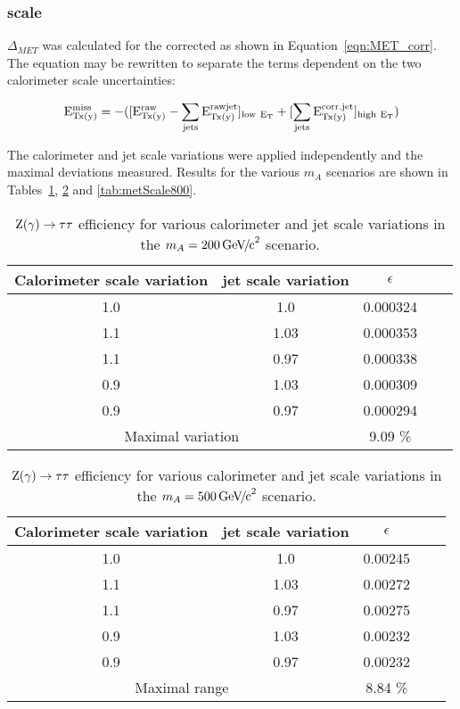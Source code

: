 \subsubsection{\MET scale}
$\Delta_{MET}$ was calculated for the corrected \MET as shown in Equation~\ref{eqn:MET_corr}. The equation may be rewritten to separate the terms dependent on the two calorimeter scale uncertainties: 

\begin{equation}
\rm E _{\rm Tx(y)}^{miss}= -([\rm E _{Tx(y)}^{\rm raw}-
                           \sum  _{jets}\rm E _{\rm Tx(y)}^{\rm raw jet}] _{\rm low~\rm E _{\rm T}} +
                           [\sum _{jets}\rm E _{\rm Tx(y)}^{\rm corr.jet}] _{\rm high~E _{\rm T}})
\end{equation}

The calorimeter and jet scale variations were applied independently and the maximal deviations measured. Results for the various $m_{A}$ scenarios are shown in Tables~\ref{tab:metScale200}, \ref{tab:metScale500} and \ref{tab:metScale800}.

\begin{table}[!Hh]
	\centering
	\begin{tabular}{|c|c|c|c|c|}
	\hline
	Calorimeter scale variation & jet scale variation & $\epsilon$ \\ \hline
	1.0   &  1.0  &   0.000324 \\ \hline
	1.1   &  1.03 &   0.000353 \\ \hline
	1.1   &  0.97 &   0.000338 \\ \hline
	0.9   &  1.03 &   0.000309 \\ \hline
	0.9   &  0.97 &   0.000294 \\ \hline
	\multicolumn{2}{|c|}{Maximal variation} & 9.09 \% \\ \hline          
    \end{tabular}
\caption{$\mathrm{Z(\gamma) \rightarrow \tau\tau}$ \MET efficiency for various calorimeter and jet scale variations in the $m_{A} = 200 {\,\mathrm{Ge\hspace{-.08em}V\hspace{-0.16em}/\hspace{-0.08em}c}^\mathrm{2}}$ scenario.\label{tab:metScale200}}
\end{table}

\begin{table}[!Hh]
	\centering
	\begin{tabular}{|c|c|c|c|c|}
	\hline
	Calorimeter scale variation & jet scale variation & $\epsilon$ \\ \hline
	1.0   &  1.0  &   0.00245 \\ \hline
	1.1   &  1.03  &  0.00272 \\ \hline
	1.1   &  0.97  &  0.00275 \\ \hline
	0.9   &  1.03  &  0.00232 \\ \hline
	0.9   &  0.97  &  0.00232 \\ \hline
	\multicolumn{2}{|c|}{Maximal range} & 8.84 \% \\ \hline          
    \end{tabular}
\caption{$\mathrm{Z(\gamma) \rightarrow \tau\tau}$ \MET efficiency for various calorimeter and jet scale variations in the $m_{A} = 500 {\,\mathrm{Ge\hspace{-.08em}V\hspace{-0.16em}/\hspace{-0.08em}c}^\mathrm{2}}$ scenario.\label{tab:metScale500}}
\end{table}

